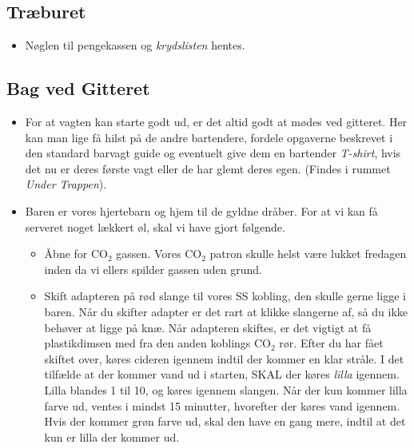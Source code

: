 \subsection{Træburet}
\label{sec:pre:træburet}

\begin{itemize}
    \item Nøglen til pengekassen og \textit{krydslisten} hentes.
\end{itemize}

\subsection{Bag ved Gitteret}
\label{sec:pre:bag-ved-gitteret}
\begin{itemize}
    \item For at vagten kan starte godt ud, er det altid godt at mødes ved gitteret.
    Her kan man lige få hilst på de andre bartendere, fordele opgaverne beskrevet i den standard
    barvagt guide og eventuelt give dem en bartender \textit{T-shirt}, hvis det nu er deres første vagt
    eller de har glemt deres egen.
    (Findes i rummet \textit{Under Trappen}).
    \item Baren er vores hjertebarn og hjem til de gyldne dråber.
    For at vi kan få serveret noget lækkert øl, skal vi have gjort følgende.
    \begin{itemize}
        \item Åbne for CO$_2$ gassen. Vores CO$_2$ patron skulle helst være lukket fredagen
        inden da vi ellers spilder gassen uden grund.
        \item Skift adapteren på rød slange til vores SS kobling, den skulle gerne ligge i baren.
        Når du skifter adapter er det rart at klikke slangerne af, så du ikke behøver at ligge på knæ.
        Når adapteren skiftes, er det vigtigt at få plastikdimsen med fra den anden koblings CO$_2$ rør.
        Efter du har fået skiftet over, køres cideren igennem indtil der kommer en klar stråle.
        I det tilfælde at der kommer vand ud i starten, SKAL der køres \textit{lilla} igennem.
        Lilla blandes 1 til 10, og køres igennem slangen. Når der kun kommer lilla farve ud, ventes i
        mindst 15 minutter, hvorefter der køres vand igennem. Hvis der kommer grøn farve ud, skal den
        have en gang mere, indtil at det kun er lilla der kommer ud.
        

\end{itemize}
\end{itemize}
